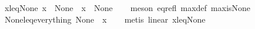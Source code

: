 \begin{isabellebody}
\isanewline
%
\endisadelimproof
\isanewline
{}\isamarkupfalse%
\ x{\isacharunderscore}leq{\isacharunderscore}None{\isacharcolon}\ {\isachardoublequoteopen}{\isacharparenleft}x\ {\isasymle}\ None{\isacharparenright}\ {\isacharequal}\ {\isacharparenleft}x\ {\isacharequal}\ None{\isacharparenright}{\isachardoublequoteclose}\isanewline
%
\isadelimproof
\ \ %
\endisadelimproof
%
\isatagproof
{}\isamarkupfalse%
\ {\isacharparenleft}meson\ eq{\isacharunderscore}refl\ max{\isacharunderscore}def\ max{\isacharunderscore}is{\isacharunderscore}None{\isacharparenright}%
\endisatagproof
{\isafoldproof}%
%
\isadelimproof
\isanewline
%
\endisadelimproof
\isanewline
{}\isamarkupfalse%
\ None{\isacharunderscore}leq{\isacharunderscore}everything{\isacharcolon}\ {\isachardoublequoteopen}None\ {\isasymle}\ x{\isachardoublequoteclose}\isanewline
%
\isadelimproof
\ \ %
\endisadelimproof
%
\isatagproof
{}\isamarkupfalse%
\ {\isacharparenleft}metis\ linear\ x{\isacharunderscore}leq{\isacharunderscore}None{\isacharparenright}%
\endisatagproof
{\isafoldproof}%
%
\isadelimproof
\isanewline
%
\endisadelimproof
%
\isadelimtheory
\isanewline
%
\endisadelimtheory
%
\isatagtheory
{}\isamarkupfalse%
%
\endisatagtheory
{\isafoldtheory}%
%
\isadelimtheory
%
\endisadelimtheory
%
\end{isabellebody}%
\endinput
